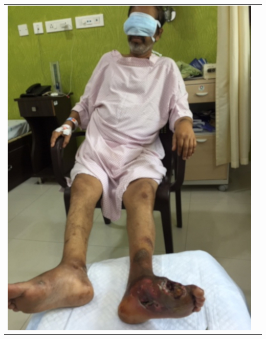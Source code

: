 \begin{center}
\vspace{-\topsep}
\begin{tabular}{@{}cc@{}}
\includegraphics[scale=.9]{images/068.jpg}&

\end{tabular}
\end{center}
